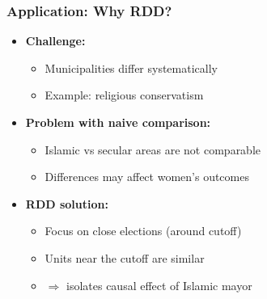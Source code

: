 \documentclass[12pt, compress]{beamer}
\begin{document}
\begin{frame}
	\frametitle{Application: Why RDD?}

\begin{itemize}
	\item \textbf{Challenge:}
	\begin{itemize}
		\item Municipalities differ systematically
		\item Example: religious conservatism
	\end{itemize}
	
	\medskip
	
	\item \textbf{Problem with naive comparison:}
	\begin{itemize}
		\item Islamic vs secular areas are not comparable
		\item Differences may affect women’s outcomes
	\end{itemize}
	
	\medskip
	
	\item \textbf{RDD solution:}
	\begin{itemize}
		\item Focus on close elections (around cutoff)
		\item Units near the cutoff are similar
		\item $\Rightarrow$ isolates causal effect of Islamic mayor
	\end{itemize}
\end{itemize}

\end{frame}
\end{document}
